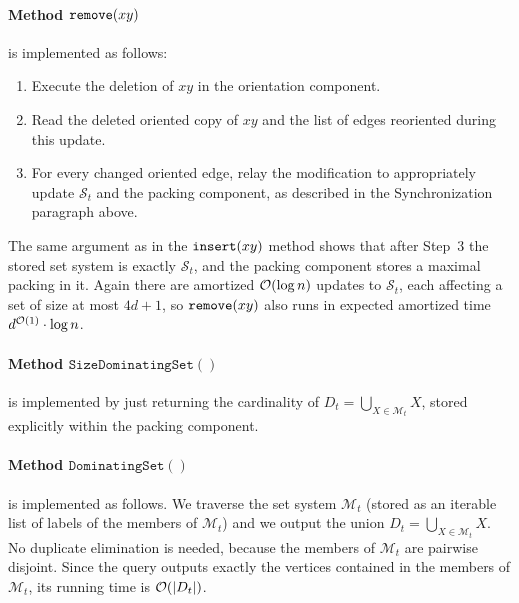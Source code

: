 \paragraph{Method $\mathtt{remove}(xy)$} is implemented as follows:
\begin{enumerate}
\item Execute the deletion of $xy$ in the orientation component.
\item Read the deleted oriented copy of $xy$ and the list of edges reoriented during this update.
\item For every changed oriented edge, relay the modification to appropriately update $\mathcal{S}_t$ and the packing component, as described in the Synchronization paragraph above.
\end{enumerate}
The same argument as in the $\mathtt{insert}(xy)$ method shows that after Step~3 the stored set system is exactly $\mathcal{S}_t$, and the packing component stores a maximal packing in it.
Again there are amortized $\mathcal{O}(\log n)$ updates to $\mathcal{S}_t$, each affecting a set of size at most $4d+1$, so $\mathtt{remove}(xy)$ also runs in expected amortized time $d^{\mathcal{O}(1)}\cdot \log n$.

\paragraph{Method $\mathtt{SizeDominatingSet()}$} is implemented by just returning the cardinality of $D_t=\bigcup_{X \in \mathcal{M}_t} X$, stored explicitly within the packing component.


\paragraph{Method $\mathtt{DominatingSet()}$} is implemented as follows.
We traverse the set system $\mathcal{M}_t$ (stored as an iterable list of labels of the members of $\mathcal{M}_t$) and we output the union $D_t=\bigcup_{X\in \mathcal{M}_t} X$.
No duplicate elimination is needed, because the members of $\mathcal{M}_t$ are pairwise disjoint.
Since the query outputs exactly the vertices contained in the members of $\mathcal{M}_t$, its running time is $\mathcal{O}(|D_t|)$.

